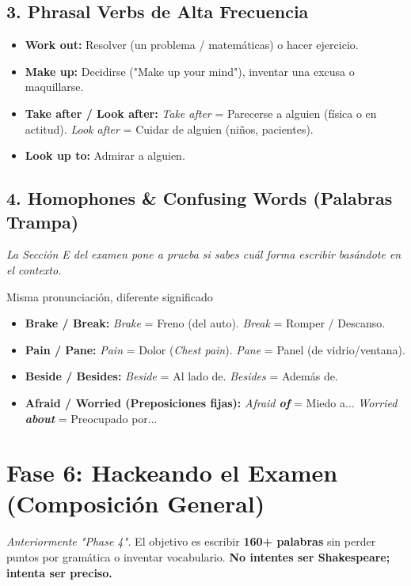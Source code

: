 \documentclass[11pt,a4paper]{article}
\begin{document}
\subsection{3. Phrasal Verbs de Alta Frecuencia}
\begin{itemize}[noitemsep]
    \item \textbf{Work out:} Resolver (un problema / matemáticas) o hacer ejercicio.
    \item \textbf{Make up:} Decidirse ("Make up your mind"), inventar una excusa o maquillarse.
    \item \textbf{Take after / Look after:} \textit{Take after} = Parecerse a alguien (física o en actitud). \textit{Look after} = Cuidar de alguien (niños, pacientes).
    \item \textbf{Look up to:} Admirar a alguien.
\end{itemize}

\subsection{4. Homophones \& Confusing Words (Palabras Trampa)}
\textit{La Sección E del examen pone a prueba si sabes cuál forma escribir basándote en el contexto.}
\begin{trapbox}{Misma pronunciación, diferente significado}
    \begin{itemize}[noitemsep]
        \item \textbf{Brake / Break:} \textit{Brake} = Freno (del auto). \textit{Break} = Romper / Descanso.
        \item \textbf{Pain / Pane:} \textit{Pain} = Dolor (\textit{Chest pain}). \textit{Pane} = Panel (de vidrio/ventana).
        \item \textbf{Beside / Besides:} \textit{Beside} = Al lado de. \textit{Besides} = Además de.
        \item \textbf{Afraid / Worried (Preposiciones fijas):} \textit{Afraid \textbf{of}} = Miedo a... \textit{Worried \textbf{about}} = Preocupado por...
    \end{itemize}
\end{trapbox}

\vspace{0.4cm}

\section{Fase 6: Hackeando el Examen (Composición General)}
\textit{Anteriormente "Phase 4".} El objetivo es escribir \textbf{160+ palabras} sin perder puntos por gramática o inventar vocabulario. \textbf{No intentes ser Shakespeare; intenta ser preciso.}
\end{document}
